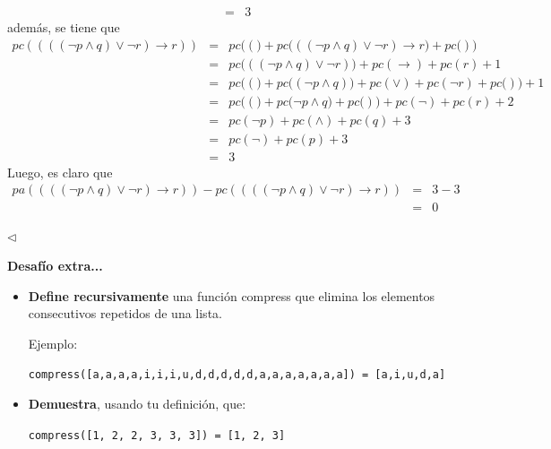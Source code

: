 \documentclass{article}
\newcommand{\code}[1]{\textcolor{white!25!black}{\texttt{#1}}}
\begin{document}
\begin{itemize}
\begin{eqnarray*}
    &=& 3
  \end{eqnarray*}
  además, se tiene que
  \begin{eqnarray*}
    pc((((\neg p \land q) \lor \neg r) \rightarrow r)) &=&
    pc\big((\big) + pc\big(((\neg p \land q) \lor \neg r) \rightarrow r\big) + pc\big()\big)\\
    &=& pc\big(((\neg p \land q)\lor \neg r)\big) + pc(\rightarrow) + pc(r) + 1\\
    &=& pc\big((\big) + pc\big((\neg p \land q)\big) + pc(\lor) + pc(\neg r) + pc\big()\big) + 1\\
    &=& pc\big((\big) + pc\big(\neg p \land q\big) + pc\big()\big) + pc(\neg) + pc(r) + 2\\
    &=& pc(\neg p) + pc(\land) + pc(q) + 3\\
    &=& pc(\neg) + pc(p) + 3\\
    &=& 3
  \end{eqnarray*}
  Luego, es claro que
  \begin{eqnarray*}
    pa((((\neg p \land q) \lor \neg r) \rightarrow r)) - pc((((\neg p \land q) \lor \neg r) \rightarrow r))
    &=& 3 - 3\\
    &=& 0
  \end{eqnarray*}
\end{itemize}
\hfill $\lhd$

\textbf{Desafío extra...}
\renewcommand{\labelitemi}{$-$}
\begin{itemize}
\item \textbf{Define recursivamente} una función compress que elimina los elementos consecutivos
  repetidos de una lista.
  
  Ejemplo:
  \begin{center}
    \code{compress([a,a,a,a,i,i,i,u,d,d,d,d,d,a,a,a,a,a,a,a]) = [a,i,u,d,a]}
  \end{center}
\item \textbf{Demuestra}, usando tu definición, que:
  \begin{center}
    \code{compress([1, 2, 2, 3, 3, 3]) = [1, 2, 3]}
  \end{center}
\end{itemize}
\end{document}

